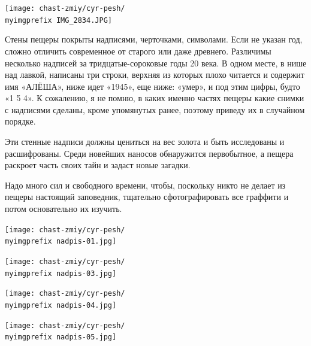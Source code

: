 \begin{center}
\texttt{[image: chast-zmiy/cyr-pesh/\\myimgprefix IMG\_2834.JPG]}
\end{center}

\newpage

Стены пещеры покрыты надписями, черточками, символами. Если не указан год, сложно отличить современное от старого или даже древнего. Различимы несколько надписей за тридцатые-сороковые годы 20 века. В одном месте, в нише над лавкой, написаны три строки, верхняя из которых плохо читается и содержит имя «АЛЁША», ниже идет «1945», еще ниже: «умер», и под этим цифры, будто «1 5 4». К сожалению, я не помню, в каких именно частях пещеры какие снимки с надписями сделаны, кроме упомянутых ранее, поэтому приведу их в случайном порядке.

Эти стенные надписи должны цениться на вес золота и быть исследованы и расшифрованы. Среди новейших наносов обнаружится первобытное, а пещера раскроет часть своих тайн и задаст новые загадки.

Надо много сил и свободного времени, чтобы, поскольку никто не делает из пещеры настоящий заповедник, тщательно сфотографировать все граффити и потом основательно их изучить. 

\vspace*{\fill}
\begin{center}
\texttt{[image: chast-zmiy/cyr-pesh/\\myimgprefix nadpis-01.jpg]}
\end{center}
\vspace*{\fill}

\newpage

\vspace*{\fill}
\begin{center}
\texttt{[image: chast-zmiy/cyr-pesh/\\myimgprefix nadpis-03.jpg]}
\end{center}

\begin{center}
\texttt{[image: chast-zmiy/cyr-pesh/\\myimgprefix nadpis-04.jpg]}
\end{center}
\vspace*{\fill}

\newpage

\vspace*{\fill}
\begin{center}
\texttt{[image: chast-zmiy/cyr-pesh/\\myimgprefix nadpis-05.jpg]}
\end{center}

